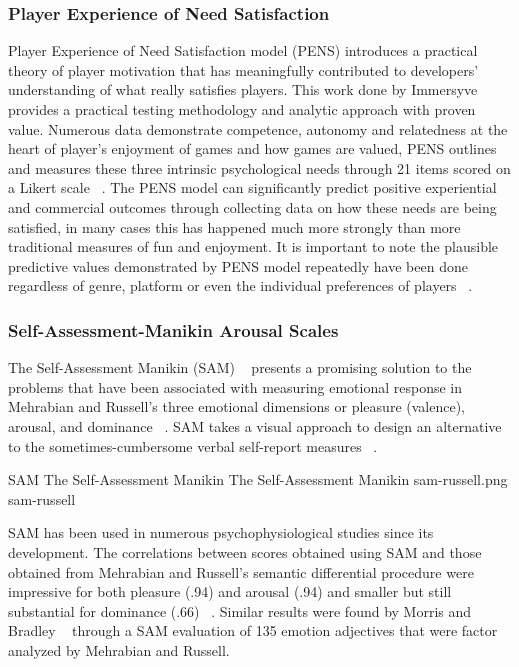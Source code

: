 \subsubsection{Player Experience of Need Satisfaction}
Player Experience of Need Satisfaction model (PENS) introduces a practical theory of player motivation that has meaningfully contributed to developers' understanding of what really satisfies players. This work done by Immersyve ~\cite{rigby2007pens} provides a practical testing methodology and analytic approach with proven value. Numerous data demonstrate competence, autonomy and relatedness at the heart of player's enjoyment of games and how games are valued, PENS outlines and measures these three intrinsic psychological needs through 21 items scored on a Likert scale ~\cite{rigby2007pens}. The PENS model can significantly predict positive experiential and commercial outcomes through collecting data on how these needs are being satisfied, in many cases this has happened much more strongly than more traditional measures of fun and enjoyment. It is important to note the plausible predictive values demonstrated by PENS model repeatedly have been done regardless of genre, platform or even the individual preferences of players ~\cite{rigby2007pens}.

\subsubsection{Self-Assessment-Manikin Arousal Scales}
The Self-Assessment Manikin (SAM) ~\cite{lang1985cognitive} presents a promising solution to the problems that have been associated with measuring emotional response in Mehrabian and Russell's three emotional dimensions or pleasure (valence), arousal, and dominance ~\cite{russell1977evidence}. SAM takes a visual approach to design an alternative to the sometimes-cumbersome verbal self-report measures ~\cite{lang1985cognitive}.

\img
{SAM The Self-Assessment Manikin}
{The Self-Assessment Manikin}
{sam-russell.png}
{sam-russell}

SAM has been used in numerous psychophysiological studies since its development. The correlations between scores obtained using SAM and those obtained from Mehrabian and Russell's semantic differential procedure were impressive for both pleasure (.94) and arousal (.94) and smaller but still substantial for dominance (.66) ~\cite{lang1985cognitive}. Similar results were found by Morris and Bradley ~\cite{morris1995observations} through a SAM evaluation of 135 emotion adjectives that were factor analyzed by Mehrabian and Russell.

